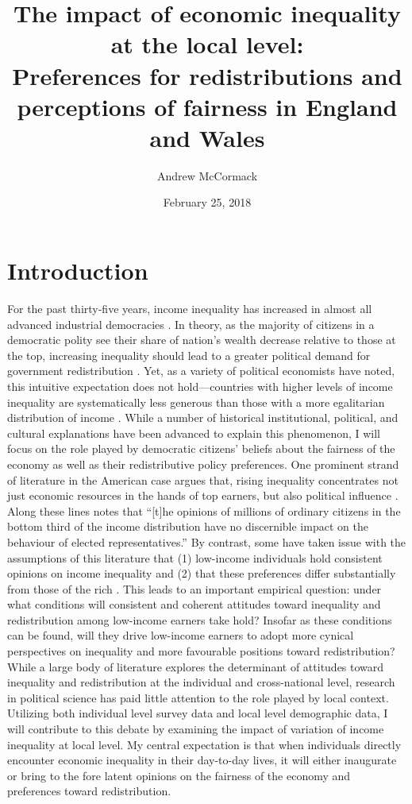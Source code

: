 \documentclass[12pt, letter]{scrartcl}
\title{{\Large The impact of economic inequality at the local level:} \\ {\Large Preferences for redistributions and perceptions of fairness in England and Wales}}
\date{February 25, 2018}
\author{Andrew McCormack}
\begin{document}
\maketitle
\doublespacing
\section{Introduction}

For the past thirty-five years, income inequality has increased in almost all advanced industrial democracies \parencite{piketty2014, OECD2015together, hopkin2016winner}. In theory, as the majority of citizens in a democratic polity see their share of nation’s wealth decrease relative to those at the top, increasing inequality should lead to a greater political demand for government redistribution \parencite{meltzer1981rational}. Yet, as a variety of political economists have noted, this intuitive expectation does not hold—countries with higher levels of income inequality are systematically less generous than those with a more egalitarian distribution of income \parencite{kenworthy2007inequality, kenworthy2005rising, iversen2009distribution, alesina2004fighting, moene2001inequality}. While a number of historical institutional, political, and cultural explanations have been advanced to explain this phenomenon, I will focus on the role played by democratic citizens’ beliefs about the fairness of the economy as well as their redistributive policy preferences. One prominent strand of literature in the American case argues that, rising inequality concentrates not just economic resources in the hands of top earners, but also political influence \parencite{gilens2012affluence, bartels2008unequal, hacker2010winner}. Along these lines  \textcite[5]{bartels2008unequal} notes that ``[t]he opinions of millions of ordinary citizens in the bottom third of the income distribution have no discernible impact on the behaviour of elected representatives.” By contrast, some have taken issue with the assumptions of this literature that (1) low-income individuals hold consistent opinions on income inequality and (2) that these preferences differ substantially from those of the rich \parencite{soroka2008limits, kelly2010inequality}. This leads to an important empirical question: under what conditions will consistent and coherent attitudes toward inequality and redistribution among low-income earners take hold? Insofar as these conditions can be found, will they drive low-income earners to adopt more cynical perspectives on inequality and more favourable positions toward redistribution?  While a large body of literature explores the determinant of attitudes toward inequality and redistribution at the individual and cross-national level, research in political science has paid little attention to the role played by local context. Utilizing both individual level survey data and local level demographic data, I will contribute to this debate by examining the impact of variation of income inequality at local level. My central expectation is that when individuals directly encounter economic inequality in their day-to-day lives, it will either inaugurate or bring to the fore latent opinions on the fairness of the economy and preferences toward redistribution. 
\end{document}
